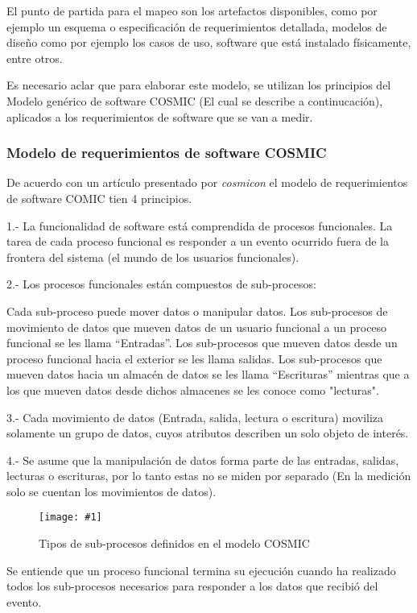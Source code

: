\documentclass{mylib/reporteCorto}
\newcommand{\insertImage}[3]{
	\begin{figure}[H]
		\centering
		\texttt{[image: \#1]}
		\caption{#2}
	\end{figure}
}
\begin{document}
El punto de partida para el mapeo son los artefactos disponibles, como por ejemplo un esquema o especificación de requerimientos detallada, modelos de diseño como por ejemplo los casos de uso, software que está instalado físicamente, entre otros.

Es necesario aclar que para elaborar este modelo, se utilizan los principios del Modelo genérico de software COSMIC (El cual se describe a continucación), aplicados a los requerimientos de software que se van a medir.

\subsubsection{Modelo de requerimientos de software COSMIC}

De acuerdo con un artículo presentado por \textit{cosmicon} el modelo de requerimientos de software COMIC tien 4 principios.

1.- La funcionalidad de software está comprendida de procesos funcionales. La tarea de cada proceso funcional es responder a un evento ocurrido fuera de la frontera del sistema (el  mundo de los usuarios funcionales).

2.- Los procesos funcionales están compuestos de sub-procesos: 

Cada sub-proceso puede mover datos o manipular datos. 
Los sub-procesos de movimiento de datos que mueven datos de un usuario funcional a un proceso funcional se les llama “Entradas”.
Los sub-procesos que mueven datos desde un proceso funcional hacia el exterior se les llama salidas. 
Los sub-procesos que mueven datos hacia un almacén de datos se les llama “Escrituras” mientras que a los que mueven datos desde dichos almacenes se les conoce como "lecturas".

3.- Cada movimiento de datos (Entrada, salida, lectura o escritura) moviliza solamente un grupo de datos, cuyos atributos describen un solo objeto de interés.

4.- Se asume que la manipulación de datos forma parte de las entradas, salidas, lecturas o escrituras, por lo tanto estas no se miden por separado (En la medición solo se cuentan los movimientos de datos).

\insertImage{img/admin/mov_cosmic}{Tipos de sub-procesos definidos en el modelo COSMIC}{12}

Se entiende que un proceso funcional termina su ejecución cuando ha realizado todos los sub-procesos necesarios para responder a los datos que recibió del evento.
\end{document}

